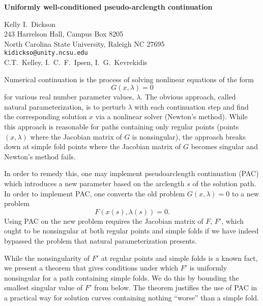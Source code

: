 \documentclass{report}
\begin{document}

\begin{center}
{\large
{\bf Uniformly well-conditioned pseudo-arclength continuation}}

	Kelly I.~Dickson \\
	243 Harrelson Hall, Campus Box 8205 \\
	North Carolina State University, Raleigh NC 27695 \\
	{\tt kidickso@unity.ncsu.edu} \\
	C.T.~Kelley, I.~C.~F.~Ipsen, I.~G.~Kevrekidis
\end{center}
Numerical continuation is the process of solving nonlinear
equations of the form \[G(x,\lambda)=0\] for various real
number parameter values, $\lambda$. The obvious approach,
called natural parameterization, is to perturb $\lambda$
with each continuation step and find the corresponding
solution $x$ via a nonlinear solver (Newton's method). While
this approach is reasonable for paths containing only
regular points (points $(x,\lambda)$ where the Jacobian
matrix of $G$ is nonsingular), the approach breaks down at
simple fold points where the Jacobian matrix of $G$ becomes
singular and Newton's method fails.

In order to remedy this,
one may implement pseudoarclength continuation (PAC) which
introduces a new parameter based on the arclength $s$ of the
solution path. In order to implement PAC, one converts the
old problem $G(x,\lambda)=0$ to a new problem
\[F(x(s),\lambda(s))=0.\]
Using PAC on the new problem
requires the Jacobian matrix of $F$, $F'$, which ought to be
nonsingular at both regular points and simple folds if we
have indeed bypassed the problem that natural
parameterization presents.

While the nonsingularity of $F'$
at regular points and simple folds is a known fact, we
present a theorem that gives conditions under which $F'$ is
uniformly nonsingular for a path containing simple folds. We
do this by bounding the smallest singular value of $F'$ from
below. The theorem justifies the use of PAC in a practical
way for solution curves containing nothing ``worse'' than a
simple fold.



\end{document}
